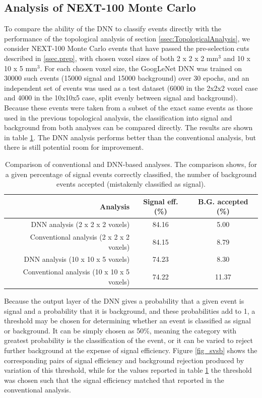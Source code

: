 \documentclass[a4paper,11pt]{article}
\begin{document}
\subsection{Analysis of NEXT-100 Monte Carlo}\label{ssec:NEXTMCanalysis}
To compare the ability of the DNN to classify events directly with the performance of the topological analysis of section \ref{ssec:TopologicalAnalysis}, we consider NEXT-100 Monte Carlo 
events that have passed the pre-selection cuts described in \ref{ssec.prep}, with chosen voxel sizes of both 2 x 2 x 2 mm$^3$ and 10 x 10 x 5 mm$^3$.  For each chosen voxel size, the 
GoogLeNet DNN was trained on 30000 such events (15000 signal and 15000 background) over 30 epochs, 
and an independent set of events was used as a test dataset (6000 in the 2x2x2 voxel case and 4000 in the 10x10x5 case, split evenly between signal and background).  Because these events were
taken from a subset of the exact same events as those used in the previous
topological analysis, the classification into signal and background from both analyses can be compared directly.  The results are shown in table \ref{tbl.DNNcomparison}.  The DNN
analysis performs better than the conventional analysis, but there is still potential room for improvement.

\begin{table}[!htb]
	\begin{center}
		\caption[DNN analysis summary]{\label{tbl.DNNcomparison}Comparison of conventional and DNN-based analyses.  The comparison shows, for a given percentage of signal events
			correctly classified, the number of background events accepted (mistakenly classified as signal).}
		\begin{tabular}{rcc}
			\\
			\textbf{Analysis} & \textbf{Signal eff. (\%)} & \textbf{B.G. accepted (\%)}\\
			\hline
			DNN analysis (2 x 2 x 2 voxels) & 84.16 & 5.00\\
			Conventional analysis (2 x 2 x 2 voxels) & 84.15 & 8.79\\
			\hline
			DNN analysis (10 x 10 x 5 voxels) & 74.23 & 8.30\\
			Conventional analysis (10 x 10 x 5 voxels) & 74.22 & 11.37\\
		\end{tabular}
	\end{center}
\end{table}

Because the output layer of the DNN gives a probability that a given event is signal and a probability that it is background, and these probabilities add to 1, a threshold may be 
chosen for determining whether an event is classified as signal or background.  It can be simply chosen as 50\%, meaning the category with greatest probability is the classification of the
event, or it can be varied to reject further background at the expense of signal efficiency.  Figure \ref{fig_svsb} shows the corresponding pairs of signal efficiency and background 
rejection produced by variation of this threshold, while for the values reported in table \ref{tbl.DNNcomparison} the threshold was chosen such that the signal efficiency matched that reported in 
the conventional analysis.
\end{document}

